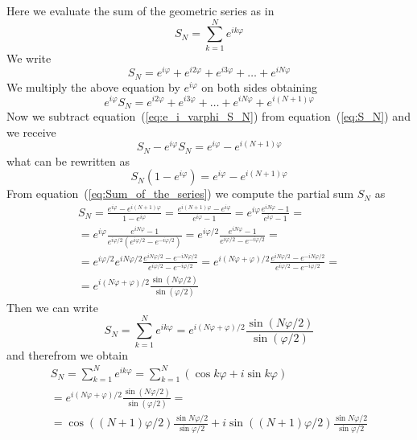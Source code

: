\documentclass[12pt]{amsart}
\theoremstyle{definition}
\numberwithin{equation}{section}
\begin{document}
Here we evaluate the sum of the geometric series as in \cite{kn:Hirst_Book}
\begin{equation}
S_{N} = \sum_{k=1}^{N} e^{ik\varphi} 
\end{equation}
We write
\begin{equation}
\label{eq:S_N}
S_{N}
=
e^{i\varphi} + e^{i2\varphi} +  e^{i3\varphi} + \ldots + e^{iN\varphi}
\end{equation}
We multiply the above equation by $e^{i\varphi}$ on both sides
obtaining
\begin{equation}
\label{eq:e_i_varphi_S_N}
e^{i\varphi} S_{N} 
=
e^{i2\varphi} +  e^{i3\varphi} + \ldots + e^{iN\varphi} + e^{i(N+1)\varphi}
\end{equation}
Now we subtract equation~(\ref{eq:e_i_varphi_S_N}) from equation~(\ref{eq:S_N}) and we receive
\begin{equation}
S_{N} - e^{i\varphi} S_{N} 
=
e^{i\varphi} - e^{i(N+1)\varphi}
\end{equation}
what can be rewritten as
\begin{equation}
\label{eq:Sum_of_the_series}
S_{N}(1 - e^{i\varphi})
=
e^{i\varphi} - e^{i(N+1)\varphi}
\end{equation}
From equation~(\ref{eq:Sum_of_the_series}) we compute the partial sum $S_{N}$ as
\begin{eqnarray}
\label{eq:Sum_of_the_series_now}
S_{N}
=
\frac{e^{i\varphi} - e^{i(N+1)\varphi}}{1 - e^{i\varphi}}
=
\frac{e^{i(N+1)\varphi} - e^{i\varphi}}{e^{i\varphi} - 1}
=
e^{i\varphi} \frac{e^{iN\varphi} - 1}{e^{i\varphi} - 1}  =   \\ \nonumber
=
e^{i\varphi} \frac{e^{iN\varphi} - 1}{e^{i\varphi/2} (e^{i\varphi/2} - e^{-i\varphi/2})}
=
e^{i\varphi/2} \frac{e^{iN\varphi} - 1}{e^{i\varphi/2} - e^{-i\varphi/2}} =                     \\ \nonumber
=
e^{i\varphi/2} e^{iN\varphi/2}   \frac{e^{iN\varphi/2} - e^{-iN\varphi/2}}{e^{i\varphi/2} - e^{-i\varphi/2}} 
=
e^{i(N\varphi + \varphi)/2}  \frac{e^{iN\varphi/2} - e^{-iN\varphi/2}}{e^{i\varphi/2} - e^{-i\varphi/2}}   =      \\ \nonumber
=
e^{i(N\varphi + \varphi)/2}  \frac{\sin(N\varphi/2)}{\sin(\varphi/2)}
\end{eqnarray}
Then we can write
\begin{equation}
S_{N} = \sum_{k=1}^{N} e^{ik\varphi} = e^{i(N\varphi + \varphi)/2}  \frac{\sin(N\varphi/2)}{\sin(\varphi/2)}
\end{equation}
and therefrom we obtain
\begin{eqnarray}
S_{N} = \sum_{k=1}^{N} e^{ik\varphi} = \sum_{k=1}^{N} (\cos k \varphi + i \sin k \varphi)             \\ \nonumber
=
e^{i(N\varphi + \varphi)/2}  \frac{\sin(N\varphi/2)}{\sin(\varphi/2)}  =  \\ \nonumber
=
\cos((N+1) \varphi/2) \frac{\sin N \varphi/2}{\sin \varphi/2} + i \sin((N+1) \varphi/2) \frac{\sin N \varphi/2}{\sin \varphi/2}
\end{eqnarray}
\end{document}

